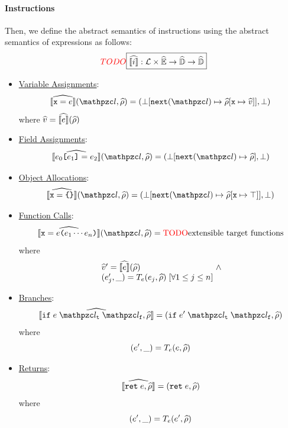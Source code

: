 \paragraph{Instructions} Then, we define the abstract semantics of instructions
using the abstract semantics of expressions as follows:
\[
  \todo
  \framebox{$\asem{\inst}: \labset \times \aenvset \rightarrow \aelemset
  \rightarrow \aelemset$}
\]
\begin{itemize}
  \item \underline{Variable Assignments}:
    \[
      \asem{\varx = \expr}(\lab, \aenv) =
      (\bot[\getnext(\lab) \mapsto \aenv[\varx \mapsto \aval]], \bot)
    \]
    where $\widehat{v} = \widehat{\llbracket{e}\rrbracket}(\widehat{\rho})$

  \item \underline{Field Assignments}:
    \[
      \asem{\expr_0 \kwsl \expr_1 \kwsr = \expr_2}(\lab, \aenv) =
      (\bot[\getnext(\lab) \mapsto \aenv], \bot)
    \]
  \item \underline{Object Allocations}:
    \[
      \asem{\varx = \kwcl \kwcr}(\lab, \aenv) =
      (\bot[\getnext(\lab) \mapsto \aenv[\varx \mapsto \top]], \bot)
    \]

  \item \underline{Function Calls}:
    \[
      \asem{\varx = \expr \kwrl \expr_1 \cdots \expr_n \kwrr}(\lab, \aenv) =
      \text{\todo extensible target functions}
    \]
    where
    \[
      \begin{array}{l@{~}c@{~}ll}
        \aval' = \asem{\expr}(\aenv) &\wedge\\
        (\expr'_j, \_) = \transforme(\expr_j, \aenv) \; [\forall 1 \leq j \leq
        n]\\
      \end{array}
    \]

  \item \underline{Branches}:
    \[
      \asem{\kwif \; \expr \; \lab_\vart \; \lab_\varf, \aenv} =
      (\kwif \; \expr' \; \lab_\vart \; \lab_\varf, \aenv)
    \]
    where
    \[
      (e', \_) = T_e(e, \widehat{\rho})
    \]

  \item \underline{Returns}:
    \[
      \widehat{\llbracket{\texttt{ret}\; e, \widehat{\rho}}\rrbracket} =
      (\texttt{ret} \; e, \widehat{\rho})
    \]
    where
    \[
      (e', \_) = T_e(e', \widehat{\rho})
    \]
\end{itemize}

